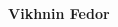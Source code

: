 \documentclass[
	10pt, %
]{FreemanCV}
\begin{document}
\begin{paracol}{2} %


\parbox[][0.11\textheight][c]{\linewidth}{ %
	\centering %
	
	{\sffamily\Huge\textbf{Vikhnin Fedor}} %
	
	
	
}









\end{paracol}
\end{document}

